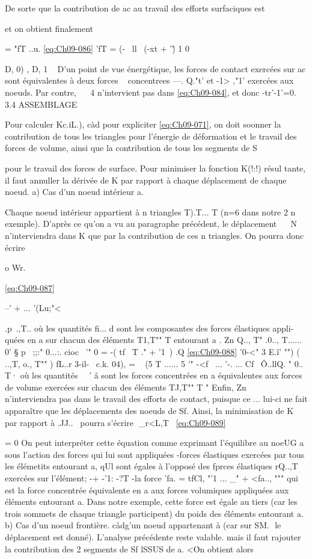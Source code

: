 {{{{{{{De sorte que la contribution de ac au travail des efforts surfaciques est 

et on obtient finalement 

= "fT ..u. 
\eqref{eq:Ch09-086} 'fT = (-~ ll~ (-xt + '\~) 1 0 

D, 0)
, D,
1 
~ 
D'un point de  vue  énergétique,  les  forces  de  contact  exercées  
sur  ac  sont  équivalentes  à deux  forces  ~ concentrees  ---. Q."t'  et  -1> ,"1'  exercées  
aux  noeuds.  Par contre,  ~~ 4  n'intervient  pas  dans  \eqref{eq:Ch09-084},  et donc  -tr'-1'=0.  
3.4 ASSEMBLAGE  

Pour calculer Kc.iL.), càd pour expliciter \eqref{eq:Ch09-071}, on doit soonner la contribution de tous les triangles pour l'énergie de déformation et le 
travail des forces de volume, ainsi que la contribution de tous les segments de S{ pour le travail des forces de surface. Pour minimiser la fonction K(!:!) résul tante, il faut annuller la dérivée de K par rapport à chaque déplacement de chaque noeud. 
a) Cas d'un noeud intérieur a. 

Chaque noeud intérieur appartient à n triangles T).T... T (n=6 dans notre
2 n exemple). D'après ce qu'on a vu au paragraphe précédent, le déplacement ~~ 
N 
n'interviendra dans K que par la contribution de ces n triangles. On pour­ra donc écrire 

o Wr.

\eqref{eq:Ch09-087} 


--' + ... 
'(Lu;"< 

.p~.,T..
où les quantités fi... d sont les composantes des forces élastiques appli­quées en a sur chacun des éléments T1,T"" T entourant a .
Zn 
Q.., T" .0.., T......
0' § p~ ;;:" 0...:. cioc~ '" 0 = -( tf~ T ." + '1\ ) 
.Q
\eqref{eq:Ch09-088} 	'0-<" 3 E.î' "") ( ..,T, o., T"" ) 
fL..r 3-il-~ c.k. 04), = ~ (5 T ...... 5 '" -<f~ ... '-. ... Cf~
Ô..llQ. 
" 
0.. T· 
où les quantités ~~' â sont les forces concentrées en a équivalentes aux forces de volume exercées sur chacun des éléments TJ,T"" T " Enfin,
Zn ~~ n'interviendra pas dans le travail des efforts de contact, puisque ce
... 
lui-ci ne 	fait apparaître que les déplacements des noeuds de Sf. Ainsi, la minimisation de K par rapport à .JJ..~ pourra s'écrire
 
_r<L,T~
\eqref{eq:Ch09-089} 

= 0 
On peut interpréter cette équation comme exprimant l'équilibre au noeUG a sous l'action des forces qui lui sont appliquées -forces élastiques exercées par tous les élémetits entourant a, qUl sont égales à l'opposé des fprces élastiques rQ..,T~ exercées sur l'élément; -+ -'1: -?T 
-la force 'fa. = tfCl, "'1 ... _" + <fa.., """ qui est la force concentrée équivalente en a aux forces volumiques appliquées aux éléments entourant a. Dans notre exemple, cette force est égale au tiers (car les trois sommets de chaque triangle participent) du poids des éléments entourant a. 
b) Cas d'un noeud frontière. càdg'un noeud appartenant à (car sur SM.
 le déplacement est donné). L'analyse précédente reste valable. mais il 
faut rajouter la contribution des 2 segments de Sf lSSUS de a. <\. 
On obtient alors 

}}}}}}}}

